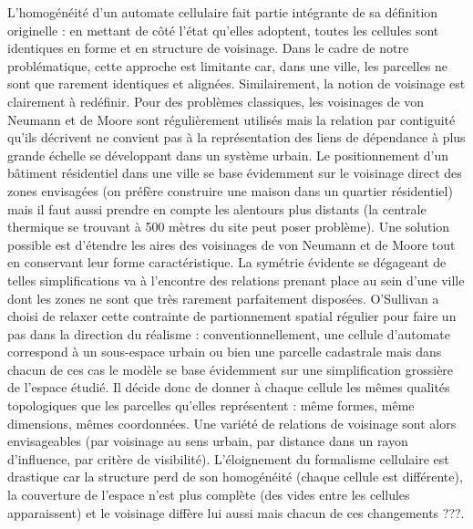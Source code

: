 \documentclass[12pt]{article}
\begin{document}
L'homogénéité d'un automate cellulaire fait partie intégrante de sa
définition originelle : en mettant de côté l'état qu'elles adoptent,
toutes les cellules sont identiques en forme et en structure de
voisinage. Dans le cadre de notre problématique, cette approche est
limitante car, dans une ville, les parcelles ne sont que rarement
identiques et alignées. Similairement, la notion de voisinage est
clairement à redéfinir. Pour des problèmes classiques, les voisinages
de von Neumann et de Moore sont régulièrement utilisés mais la
relation par contiguité qu'ils décrivent ne convient pas à la
représentation des liens de dépendance à plus grande échelle se
développant dans un système urbain. Le positionnement d'un bâtiment
résidentiel dans une ville se base évidemment sur le voisinage direct
des zones envisagées (on préfère construire une maison dans un
quartier résidentiel) mais il faut aussi prendre en compte les
alentours plus distants (la centrale thermique se trouvant à 500
mètres du site peut poser problème). Une solution possible est
d'étendre les aires des voisinages de von Neumann et de Moore tout en
conservant leur forme caractéristique. La symétrie évidente se
dégageant de telles simplifications va à l'encontre des relations
prenant place au sein d'une ville dont les zones ne sont que très
rarement parfaitement disposées. O'Sullivan a choisi de relaxer cette
contrainte de partionnement spatial régulier pour faire un pas dans la
direction du réalisme \cite{O'Sullivan2000,O'Sullivan2001} :
conventionnellement, une cellule d'automate correspond à un
sous-espace urbain ou bien une parcelle cadastrale mais dans chacun de
ces cas le modèle se base évidemment sur une simplification grossière
de l'espace étudié. Il décide donc de donner à chaque cellule les
mêmes qualités topologiques que les parcelles qu'elles représentent :
même formes, même dimensions, mêmes coordonnées. Une variété de
relations de voisinage sont alors envisageables (par voisinage au sens
urbain, par distance dans un rayon d'influence, par critère de
visibilité). L'éloignement du formalisme cellulaire est drastique car
la structure perd de son homogénéité (chaque cellule est différente),
la couverture de l'espace n'est plus complète (des vides entre les
cellules apparaissent) et le voisinage diffère lui aussi mais chacun
de ces changements ???.
\end{document}
